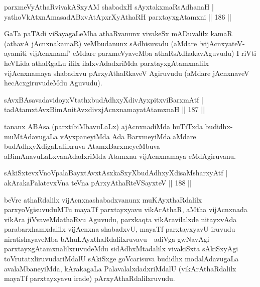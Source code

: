 \begin{shl}
parxmeVyAthaRvivakASxyAM shabadxH sAyxtakxmaRsAdhanaH |\\
yathoVkAtxnAmasadABxvAtApxrXyAthaRH parxtayxgAtamxni \hfill || 186 ||
\end{shl}

\begin{artha}
GaTa paTAdi viSayagaLeMba athaRvanunx vivakeSx mADuvalilx kamaR (athavA 
jAcnxnakamaR) veMbudanunx sAdhisuvadu (aMdare `vijAcnxyateV-ayamiti vijAcnxnamf' eMdare parxmeVyaveMba athaRsAdhakavAguvudu) I riVti heVLida athaRgaLu ililx ilalxvAdadxriMda parxtayxgAtamxnalilx vijAcnxnamaya shabadxvu pArxyAthaRkaveV Agiruvudu (aMdare jAcnxnaveV hecAcxgiruvudeMdu Aguvudu).\\
\end{artha}


\begin{shl}
sAvxBAsavadavidoyxVtathxbudAdhxyXdivAyxpitxviBarxmAtf |\\
tadAtamxtAvxBimAnitAvxdivxjAcnxnamayatA\s \s tamxnaH \hfill || 187 ||
\end{shl}

\begin{artha}
tananx ABAsa (parxtibiMbavuLaLx) ajAcnxnadiMda huTiTxda budidhx-muMtAdavugaLa vAyxpaneyiMda Ada BarxmeyiMda aMdare budAdhxyXdigaLalilxruva AtamxBarxmeyeMbuva aBimAnavuLaLxvanAdadxriMda Atamxnu vijAcnxnamaya eMdAgiruvanu.
\end{artha}

\begin{shl}
sAkiSxtevxVnoVpalaBayxtAvxtAsxkaSxyXbudAdhxyXdisaMsharxyAtf |\\
akArakaPalatevxVna teVna pArxyAthaRteVSayxteV \hfill || 188 ||
\end{shl}


\begin{artha}
beVre athaRdalilx vijAcnxnashabadxvanunx muKAyxthaRdalilx parxyoVgisuvuduMTu  mayaTf parxtayxyavu vikArAthaR, aMtha vijAcnxnada vikAra jiVvaveMdathaRvu Aguvudu, parxkaqta vikAravilalxde nitayxvAda parabarxhamxdalilx vijAcnxna shabadxvU, mayaTf  parxtayxyavU iruvudu niratishayaveMba bAhuLAyxthaRdalilxruvavu - adiVga gwNavAgi parxtayxgAtamxnalilxruvudeMdu sidAdhxMtadalilx vivakiSxta sAkiSxyAgi toVrutatxliruvudariMdalU sAkiSxge goVcarisuva budidhx modalAdavugaLa avalaMbaneyiMda, kArakagaLa PalavalalxdadxriMdalU (vikArAthaRdalilx mayaTf parxtayxyavu irade) pArxyAthaRdalilxruvudu.
\end{artha}

